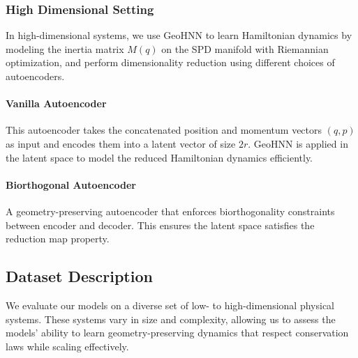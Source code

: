 \documentclass{article}
\theoremstyle{plain}
\theoremstyle{definition}
\theoremstyle{remark}
\begin{document}
\subsubsection{High Dimensional Setting}
In high-dimensional systems, we use GeoHNN to learn Hamiltonian dynamics by modeling the inertia matrix \(M(q)\) on the SPD manifold with Riemannian optimization, and perform dimensionality reduction using different choices of autoencoders.

\paragraph{Vanilla Autoencoder}
This autoencoder takes the concatenated position and momentum vectors \((q, p)\) as input and encodes them into a latent vector of size \(2r\). GeoHNN is applied in the latent space to model the reduced Hamiltonian dynamics efficiently.

\paragraph{Biorthogonal Autoencoder}
A geometry-preserving autoencoder that enforces biorthogonality constraints between encoder and decoder. This ensures the latent space satisfies the reduction map property.


\subsection{Dataset Description}

We evaluate our models on a diverse set of low- to high-dimensional physical systems. These systems vary in size and complexity, allowing us to assess the models’ ability to learn geometry-preserving dynamics that respect conservation laws while scaling effectively. 
\end{document}
